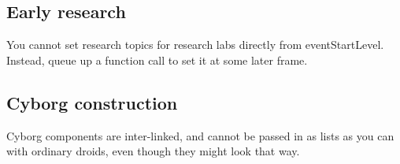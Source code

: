 \documentclass[12pt]{article}
\begin{document}
\subsection{Early research}
You cannot set research topics for research labs directly from eventStartLevel. Instead, queue up a function
call to set it at some later frame.

\subsection{Cyborg construction}
Cyborg components are inter-linked, and cannot be passed in as lists as you can with ordinary droids, even
though they might look that way.
\end{document}
